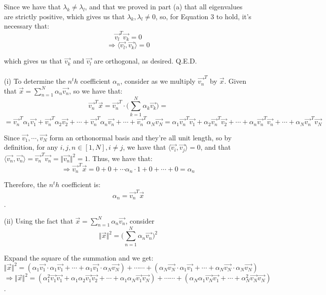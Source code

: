 \documentclass{article}
\begin{document}
Since we have that $\lambda_k\neq \lambda_l$, and that we proved in part (a) that all eigenvalues are strictly positive, which gives us that $\lambda_k, \lambda_l \neq 0$, so, for Equation 3 to hold, it's necessary that:
$$\vec{v_l}^T \vec{v_k} = 0$$
$$\Longrightarrow \langle \vec{v_l}, \vec{v_k} \rangle = 0$$

which gives us that $\vec{v_k}$ and $\vec{v_l}$ are orthogonal, as desired. Q.E.D. \\

 \\


{\color{red} (i)} To determine the $n^th$ coefficient $\alpha_n$, consider as we multiply $\vec{v_n}^T$ by $\vec{x}$.
Given that
$\vec{x} = \sum\limits_{n=1}^N \alpha_n\vec{v_n}$, so we have that:
$$\vec{v_n}^T \vec{x} =
\vec{v_n}^T \cdot
	\Big(\sum\limits_{k=1}^N \alpha_k\vec{v_k}\Big) =$$
$$ =
\vec{v_n}^T \alpha_1\vec{v_1} + \vec{v_n}^T \alpha_2\vec{v_2}
	+ \cdots + \vec{v_n}^T \alpha_n\vec{v_n} + \cdots +
	\vec{v_n}^T \alpha_N\vec{v_N} =
\alpha_1 \vec{v_n}^T\vec{v_1} + \alpha_2 \vec{v_n}^T\vec{v_2}
	+ \cdots + \alpha_n \vec{v_n}^T\vec{v_n} + \cdots +
	\alpha_N \vec{v_n}^T\vec{v_N}$$

Since $\vec{v_1},\cdots,\vec{v_N}$ form an orthonormal basis and they're all unit length, so by definition,
for any $i,j,n\in[1,N], i\neq j$, we have that
$\langle \vec{v_i}, \vec{v_j} \rangle = 0$, and that
$\langle \vec{v_n}, \vec{v_n} \rangle =
\vec{v_n}^T \vec{v_n} = \Vert\vec{v_n}\Vert^2 = 1$. Thus, we have that:
$$\Longrightarrow \vec{v_n}^T \vec{x} =
0 + 0 + \cdots \alpha_n\cdot1 + 0 + \cdots + 0 = \alpha_n$$

Therefore, the $n^th$ coefficient is:
$$\alpha_n = \vec{v_n}^T \vec{x}$$
{\color{white} .}

{\color{red} (ii)} Using the fact that
$\vec{x} = \sum\limits_{n=1}^N \alpha_n\vec{v_n}$, consider
$$\Vert\vec{x}\Vert^2 =
\Big(\sum\limits_{n=1}^N \alpha_n\vec{v_n}\Big)^2$$

Expand the square of the summation and we get:
$$\Vert\vec{x}\Vert^2 =
(\alpha_1\vec{v_1}\cdot\alpha_1\vec{v_1} + \cdots +
	\alpha_1\vec{v_1}\cdot\alpha_N\vec{v_N}) + \cdots\cdots +
(\alpha_N\vec{v_N}\cdot\alpha_1\vec{v_1} + \cdots +
	\alpha_N\vec{v_N}\cdot\alpha_N\vec{v_N}) $$
$$\Longrightarrow \Vert\vec{x}\Vert^2 =
(\alpha_1^2 \vec{v_1}\vec{v_1} +
	\alpha_1\alpha_2 \vec{v_1}\vec{v_2} + \cdots +
	\alpha_1\alpha_N \vec{v_1}\vec{v_N}) + \cdots\cdots +
(\alpha_N\alpha_1 \vec{v_N}\vec{v_1} + \cdots +
	\alpha_N^2 \vec{v_N}\vec{v_N}) $$
{\color{white} .}
\end{document}
